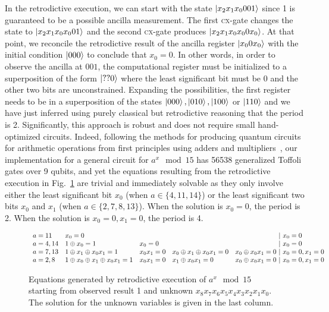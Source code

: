 \documentclass{article}
\newcommand{\cx}{\textsc{cx}}
\begin{document}
\begin{refsection}
In the retrodictive execution, we can start with the state
$\ket{x_2x_1x_0001}$ since 1 is guaranteed to be a possible
ancilla measurement. The first \cx-gate changes the state to
$\ket{x_2x_1x_0x_001}$ and the second \cx-gate produces
$\ket{x_2x_1x_0x_00x_0}$. At that point, we reconcile the
retrodictive result of the ancilla register $\ket{x_00x_0}$ with the
initial condition $\ket{000}$ to conclude that $x_0=0$. In other
words, in order to observe the ancilla at $001$, the computational
register must be initialized to a superposition of the form
$\ket{??0}$ where the least significant bit must be 0 and the other
two bits are unconstrained. Expanding the possibilities, the first
register needs to be in a superposition of the states $\ket{000},
\ket{010}, \ket{100}$ or $\ket{110}$ and we have just inferred using
purely classical but retrodictive reasoning that the period is
2. Significantly, this approach is robust and does not require small
hand-optimized circuits. Indeed, following the methods for producing
quantum circuits for arithmetic operations from first principles using
adders and multipliers~\cite{PhysRevA.54.147}, our implementation for
a general circuit for $a^x \mod{15}$ has 56538 generalized Toffoli
gates over 9 qubits, and yet the equations resulting from the
retrodictive execution in Fig.~\ref{fig:shor-eqs} are trivial and
immediately solvable as they only involve either the least significant
bit $x_0$ (when $a \in \{4,11,14\}$) or the least significant two bits
$x_0$ and $x_1$ (when $a \in \{2,7,8,13\}$). When the solution is
$x_0=0$, the period is 2. When the solution is $x_0=0,x_1=0$, the
period is 4.

\begin{figure}
\[\begin{array}{l@{\quad}llll@{~|~}l}
a=11 & x_0 = 0 &&&& x_0 = 0 \\
a=4,14 & 1 \oplus x_0 = 1 & x_0 = 0 &&
  & x_0 = 0 \\
a=7,13 & 1 \oplus x_1 \oplus x_0x_1 = 1 & x_0x_1 = 0 & x_0 \oplus x_1 \oplus x_0x_1 = 0 &  x_0 \oplus x_0x_1 = 0 & x_0=0, x_1=0 \\
a=2,8 & 1 \oplus x_0 \oplus x_1 \oplus x_0x_1 = 1 & x_0x_1 = 0 & x_1 \oplus x_0x_1 = 0 & x_0 \oplus x_0x_1 = 0  & x_0=0,x_1=0
\end{array}\]
\caption{\label{fig:shor-eqs}Equations generated by retrodictive
  execution of $a^x \mod{15}$ starting from observed result 1 and
  unknown $x_8x_7x_6x_5x_4x_3x_2x_1x_0$. The solution for the unknown
  variables is given in the last column.}
\end{figure}


\end{refsection}
\end{document}

